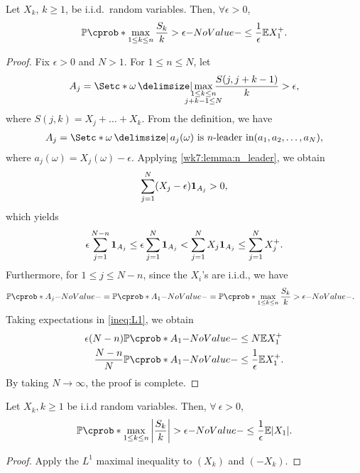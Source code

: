 \documentclass[12pt]{article}
\begin{document}
\begin{Theorem} \label{wk7:thm:maximal_inequality}
Let $X_k$, $k \geq 1$, be i.i.d.\ random variables. Then, $\forall \epsilon > 0$,
\begin{align*}
\P(\max_{1 \leq k \leq n} \frac{S_k}{k} > \epsilon) \leq \ofrac{\epsilon}\E X_1^+.
\end{align*}
\end{Theorem}
\begin{proof}
Fix $\epsilon > 0$ and $N>1$. For $1\leq n \leq N$, let
\begin{align*}
A_j = \set*{\omega\given \max_{\mathclap{\substack{1 \leq k \leq n \\ j+k-1 \leq N}}} \frac{S(j,j+k-1)}{k} > \epsilon},
\end{align*}
where $S(j,k) = X_j + \ldots + X_k$. From the definition, we have
\begin{align*}
A_j = \set*{\omega\given a_j(\omega) \ \text{is $n$-leader in} (a_1, a_2, \ldots, a_N)},
\end{align*}
where $a_j(\omega) = X_j(\omega) - \epsilon$.
Applying \cref{wk7:lemma:n_leader}, we obtain
\begin{align*}
\sum_{j=1}^N (X_j - \epsilon) {\bf 1}_{A_j} > 0,
\end{align*}
which yields
\begin{align}
\epsilon \sum_{j=1}^{N-n} {\bf 1}_{A_j} 
\leq \epsilon \sum_{j=1}^N {\bf 1}_{A_j}
< \sum_{j=1}^N X_j {\bf 1}_{A_j}
\leq \sum_{j=1}^N X_j^+. \label{ineq:L1}
\end{align}
Furthermore, for $1 \leq j \leq N- n$, since the $X_i$'s are i.i.d., we have
\begin{align*}
\P(A_j) 
= \P(A_1)
&= \P(\max_{1 \leq k \leq n} \frac{S_k}{k} > \epsilon).
\end{align*}
Taking expectations in \cref{ineq:L1}, we obtain
\begin{align*}
\epsilon (N-n) \P(A_1) &\leq N \E X_1^+ \\
\frac{N-n}{N} \P(A_1) &\leq \frac{1}{\epsilon} \E X_1^+.
\end{align*}
By taking $N \to \infty$, the proof is complete.
\end{proof}

\begin{Corollary} \label{wk7:cor:maximal_inequality}
Let $X_k, k \geq 1$ be i.i.d random variables. Then, $\forall\ \epsilon > 0$,
\begin{align*}
\P(\max_{1 \leq k \leq n} \left|\frac{S_k}{k}\right| > \epsilon) \leq \frac{1}{\epsilon} \E |X_1|.
\end{align*}
\end{Corollary}
\begin{proof}
Apply the $L^1$ maximal inequality to $(X_k)$ and $(-X_k)$.
\end{proof}
\end{document}
